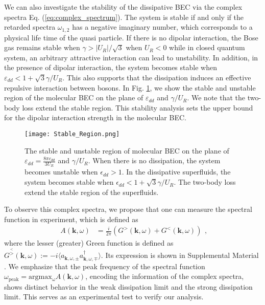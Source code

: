 \documentclass[aps,prl,twocolumn,superscriptaddress,]{revtex4-1}
\newcommand{\tmmathbf}[1]{\ensuremath{\boldsymbol{#1}}}
\begin{document}
We can also investigate the stability of the dissipative BEC via the complex spectra Eq. (\ref{eq:complex_spectrum}). The system is stable if and only if the retarded spectra $\omega_{1,2}$ has a negative imaginary number, which corresponds to a physical life time of the quasi particle. If there is no dipolar interaction, the Bose gas remains stable when $\gamma>|U_R|/\sqrt{3}$ when $U_R<0$ \cite{Ce2022} while in closed quantum system, an arbitrary attractive interaction can lead to unstability. In addition, in the presence of dipolar interaction, the system becomes stable when $\varepsilon_{dd}<1+\sqrt{3}\gamma/U_R$. This also supports that the dissipation induces an effective repulsive interaction between bosons. In Fig. \ref{fig:stable}, we show the stable and unstable region of the molecular BEC on the plane of $\varepsilon_{dd}$ and $\gamma/U_R$. We note that the two-body loss extend the stable region. This stability analysis sets the upper bound for the dipolar interaction strength in the molecular BEC. 
\begin{figure}
    \texttt{[image: Stable\_Region.png]}
    
    \caption{The stable and unstable region of molecular BEC on the plane of $\varepsilon_{dd}=\frac{8\pi c_{dd}}{3U_R}$ and $\gamma/U_R$. When there is no dissipation, the system becomes unstable when $\epsilon_{dd}>1$. In the dissipative superfluids, the system becomes stable when $\epsilon_{dd}<1+\sqrt{3}\gamma/U_R$. The two-body loss extend the stable region of the superfluids. }
    
       \label{fig:stable}
\end{figure}


To observe this complex spectra, we propose that one can measure the spectral function in experiment, which is defined as 
\begin{equation}
	\begin{aligned}A(\bm{k},\omega) & =\frac{i}{2\pi}(G^{>}(\bm{k},\omega)+G^{<}(\bm{k},\omega))\end{aligned}
	,\label{eq:spectrum_function}
\end{equation}
where the lesser (greater) Green function is defined as $G^{\overset{<}{>}}(\bm{k},\omega):=-i\langle a_{\tmmathbf{k},\omega,\pm}a_{\tmmathbf{k},\omega,\mp}^{\dagger}\rangle$.
Its expression is shown in Supplemental Material \cite{SupplementaryMaterial}. We emphasize that the peak frequency of the spectral function $\omega_{\mathrm{peak}}=\mathrm{argmax_\omega}A(\bm{k},\omega)$, encoding the information of the complex spectra, shows distinct behavior in the weak dissipation limit and the strong dissipation limit. This serves as an experimental test to verify our analysis.
\end{document}
